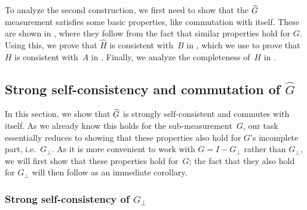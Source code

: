 To analyze the second construction,
we first need to show that the $\widehat{G}$ measurement
satisfies some basic properties, like commutation with itself.
These are shown in ,
where they follow from the fact that similar properties hold for $G$.
Using this, we prove that $\widehat{H}$ is consistent with~$B$ in ,
which we use to prove that $H$ is consistent with~$A$ in .
Finally, we analyze the completeness of~$H$ in .


\subsection{Strong self-consistency and commutation of $\widehat{G}$}
\label{sec:hat-consistency}

In this section, we show that $\widehat{G}$ is strongly self-consistent and commutes with itself.
As we already know this holds for the sub-measurement~$G$,
our task essentially reduces to showing that these properties also hold for $G$'s incomplete part,
i.e.\ $G_{\perp}$.
As it is more convenient to work with $G = I - G_{\perp}$ rather than $G_{\perp}$,
we will first show that these properties hold for~$G$;
the fact that they also hold for $G_{\perp}$ will then follow as an immediate corollary.

\subsubsection{Strong self-consistency of $G_{\perp}$}

